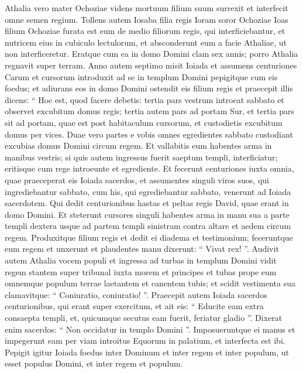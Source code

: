 \begin{biblechapter}
\begin{biblechapter}
\begin{biblechapter}
\begin{biblechapter}
\begin{biblechapter}
\begin{biblechapter}
\begin{biblechapter}
\begin{biblechapter}
\begin{biblechapter}
\begin{biblechapter}
\begin{biblechapter}
 \verse Athalia vero mater Ochoziae videns mortuum filium suum surrexit et interfecit omne semen regium. 
\verse Tollens autem Iosaba filia regis Ioram soror Ochoziae Ioas filium Ochoziae furata est eum de medio filiorum regis, qui interficiebantur, et nutricem eius in cubiculo lectulorum, et absconderunt eum a facie Athaliae, ut non interficeretur. 
\verse Eratque cum ea in domo Domini clam sex annis; porro Athalia regnavit super terram.
 \verse Anno autem septimo misit Ioiada et assumens centuriones Carum et cursorum introduxit ad se in templum Domini pepigitque cum eis foedus; et adiurans eos in domo Domini ostendit eis filium regis 
\verse et praecepit illis dicens: “ Hoc est, quod facere debetis: tertia pars vestrum introeat sabbato et observet excubitum domus regis; 
\verse tertia autem pars ad portam Sur, et tertia pars sit ad portam, quae est post habitaculum cursorum, et custodietis excubitum domus per vices. 
\verse Duae vero partes e vobis omnes egredientes sabbato custodiant excubias domus Domini circum regem. 
\verse Et vallabitis eum habentes arma in manibus vestris; si quis autem ingressus fuerit saeptum templi, interficiatur; eritisque cum rege introeunte et egrediente.
 \verse Et fecerunt centuriones iuxta omnia, quae praeceperat eis Ioiada sacerdos, et assumentes singuli viros suos, qui ingrediebantur sabbato, cum his, qui egrediebantur sabbato, venerunt ad Ioiada sacerdotem. 
\verse Qui dedit centurionibus hastas et peltas regis David, quae erant in domo Domini. 
\verse Et steterunt cursores singuli habentes arma in manu sua a parte templi dextera usque ad partem templi sinistram contra altare et aedem circum regem. 
\verse Produxitque filium regis et dedit ei diadema et testimonium; feceruntque eum regem et unxerunt et plaudentes manu dixerunt: “ Vivat rex! ”.
 \verse Audivit autem Athalia vocem populi et ingressa ad turbas in templum Domini 
 \verse vidit regem stantem super tribunal iuxta morem et principes et tubas prope eum omnemque populum terrae laetantem et canentem tubis; et scidit vestimenta sua clamavitque: “ Coniuratio, coniuratio! ”.
 \verse Praecepit autem Ioiada sacerdos centurionibus, qui erant super exercitum, et ait eis: “ Educite eam extra consaepta templi, et, quicumque secutus eam fuerit, feriatur gladio ”. Dixerat enim sacerdos: “ Non occidatur in templo Domini ”. 
 \verse Imposueruntque ei manus et impegerunt eam per viam introitus Equorum in palatium, et interfecta est ibi.
 \verse Pepigit igitur Ioiada foedus inter Dominum et inter regem et inter populum, ut esset populus Domini, et inter regem et populum. 

\end{biblechapter}
\end{biblechapter}
\end{biblechapter}
\end{biblechapter}
\end{biblechapter}
\end{biblechapter}
\end{biblechapter}
\end{biblechapter}
\end{biblechapter}
\end{biblechapter}
\end{biblechapter}
